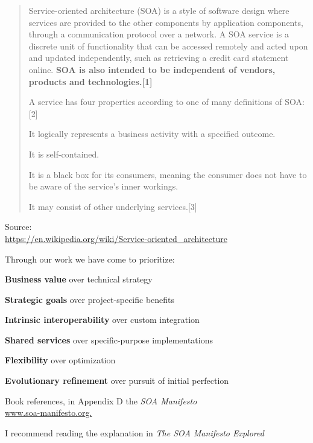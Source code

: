 \documentclass[Screen16to9,17pt]{foils}
\begin{document}

\begin{quote}
Service-oriented architecture (SOA) is a style of software design where services are provided to the other components by application components, through a communication protocol over a network. A SOA service is a discrete unit of functionality that can be accessed remotely and acted upon and updated independently, such as retrieving a credit card statement online. {\bf SOA is also intended to be independent of vendors, products and technologies.[1]}

A service has four properties according to one of many definitions of SOA:[2]
\begin{list2}
\item It logically represents a business activity with a specified outcome.
\item It is self-contained.
\item It is a black box for its consumers, meaning the consumer does not have to be aware of the service's inner workings.
\item It may consist of other underlying services.[3]
\end{list2}
\end{quote}
Source:{\footnotesize\\
\url{https://en.wikipedia.org/wiki/Service-oriented_architecture}}




Through our work we have come to prioritize:
\begin{list2}
\item {\bf Business value} over technical strategy
\item {\bf Strategic goals} over project-specific benefits
\item {\bf Intrinsic interoperability} over custom integration
\item {\bf Shared services} over specific-purpose implementations
\item {\bf Flexibility} over optimization
\item {\bf Evolutionary refinement} over pursuit of initial perfection
\end{list2}

Book references, in Appendix D the \emph{SOA Manifesto}\\
\url{www.soa-manifesto.org.}

I recommend reading the explanation in \emph{The SOA Manifesto Explored}
\end{document}
